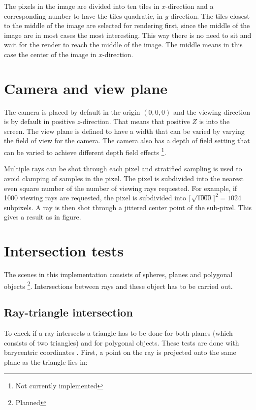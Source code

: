 \documentclass[a4paper]{report}
\begin{document}
The pixels in the image are divided into ten tiles in \(x\)-direction and
a corresponding number to have the tiles quadratic, in
\(y\)-direction. The tiles closest to the middle of the image are
selected for rendering first, since the middle of the image are in
most cases the most interesting. This way there is no need to sit and
wait for the render to reach the middle of the image. The middle means
in this case the center of the image in \(x\)-direction.

\section{Camera and view plane}
\label{sec:cam}

The camera is placed by default in the origin \((0, 0, 0)\) and the
viewing direction is by default in positive \(z\)-direction. That
means that positive \(Z\) is into the screen. The view plane is
defined to have a width that can be varied by varying the field of
view for the camera. The camera also has a depth of field setting that
can be varied to achieve different depth field effects \footnote{Not
  currently implemented}.

Multiple rays can be shot through each pixel and stratified sampling
is used to avoid clamping of samples in the pixel. The pixel is
subdivided into the nearest even square number of the number of
viewing rays requested. For example, if 1000 viewing rays are
requested, the pixel is subdivided into \(\lceil \sqrt{1000}
\rceil^2 = 1024 \) subpixels. A ray is then shot through a jittered
center point of the sub-pixel. This gives a result as in figure. %


\section{Intersection tests}

The scenes in this implementation consists of spheres, planes and
polygonal objects \footnote{Planned}. Intersections between rays and
these object has to be carried out.

\subsection{Ray-triangle intersection}

To check if a ray intersects a triangle has to be done for both planes
(which consists of two triangles) and for polygonal objects. These
tests are done with barycentric coordinates \cite{pointTest:10}. First, a point on the ray
is projected onto the same plane as the triangle lies in:
\end{document}
